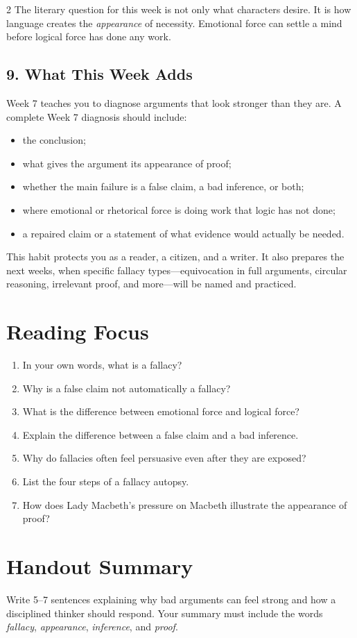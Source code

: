 \documentclass[12pt]{article}
\begin{document}
\begin{multicols}{2}
The literary question for this week is not only what characters desire. It is how language creates the \textit{appearance} of necessity. Emotional force can settle a mind before logical force has done any work.

\subsection*{9. What This Week Adds}
Week 7 teaches you to diagnose arguments that look stronger than they are. A complete Week 7 diagnosis should include:

\begin{itemize}[leftmargin=*,itemsep=0.12em]
\item the conclusion;
\item what gives the argument its appearance of proof;
\item whether the main failure is a false claim, a bad inference, or both;
\item where emotional or rhetorical force is doing work that logic has not done;
\item a repaired claim or a statement of what evidence would actually be needed.
\end{itemize}

This habit protects you as a reader, a citizen, and a writer. It also prepares the next weeks, when specific fallacy types---equivocation in full arguments, circular reasoning, irrelevant proof, and more---will be named and practiced.

\section*{Reading Focus}
\begin{enumerate}[leftmargin=*]
\item In your own words, what is a fallacy?
\item Why is a false claim not automatically a fallacy?
\item What is the difference between emotional force and logical force?
\item Explain the difference between a false claim and a bad inference.
\item Why do fallacies often feel persuasive even after they are exposed?
\item List the four steps of a fallacy autopsy.
\item How does Lady Macbeth's pressure on Macbeth illustrate the appearance of proof?
\end{enumerate}

\section*{Handout Summary}
Write 5--7 sentences explaining why bad arguments can feel strong and how a disciplined thinker should respond. Your summary must include the words \textit{fallacy}, \textit{appearance}, \textit{inference}, and \textit{proof}.
\end{multicols}
\end{document}
